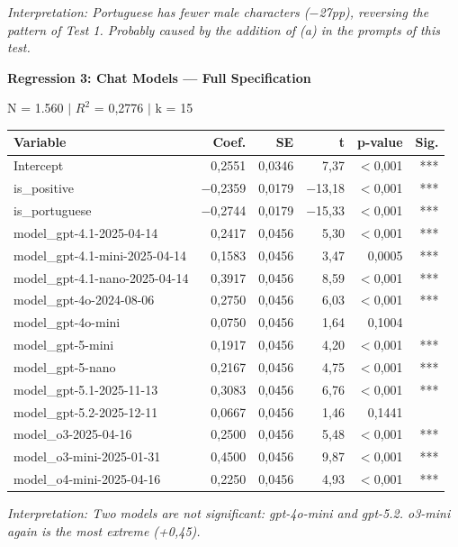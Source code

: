 \documentclass[12pt,a4paper]{article}
\begin{document}
\noindent\textit{Interpretation: Portuguese has fewer male characters ($-$27pp),
reversing the pattern of Test 1. Probably caused by the addition of (a)
in the prompts of this test.}

\vspace{0.5cm}
\noindent\textbf{Regression 3: Chat Models --- Full Specification}

\noindent N = 1.560 $|$ $R^2$ = 0,2776 $|$ k = 15

\begin{table}[H]
\centering
\small
\begin{tabular}{lrrrrr}
\toprule
\textbf{Variable} & \textbf{Coef.} & \textbf{SE} & \textbf{t} & \textbf{p-value} & \textbf{Sig.} \\
\midrule
Intercept & 0,2551 & 0,0346 & 7,37 & $<$0,001 & *** \\
is\_positive & $-$0,2359 & 0,0179 & $-$13,18 & $<$0,001 & *** \\
is\_portuguese & $-$0,2744 & 0,0179 & $-$15,33 & $<$0,001 & *** \\
model\_gpt-4.1-2025-04-14 & 0,2417 & 0,0456 & 5,30 & $<$0,001 & *** \\
model\_gpt-4.1-mini-2025-04-14 & 0,1583 & 0,0456 & 3,47 & 0,0005 & *** \\
model\_gpt-4.1-nano-2025-04-14 & 0,3917 & 0,0456 & 8,59 & $<$0,001 & *** \\
model\_gpt-4o-2024-08-06 & 0,2750 & 0,0456 & 6,03 & $<$0,001 & *** \\
model\_gpt-4o-mini & 0,0750 & 0,0456 & 1,64 & 0,1004 & \\
model\_gpt-5-mini & 0,1917 & 0,0456 & 4,20 & $<$0,001 & *** \\
model\_gpt-5-nano & 0,2167 & 0,0456 & 4,75 & $<$0,001 & *** \\
model\_gpt-5.1-2025-11-13 & 0,3083 & 0,0456 & 6,76 & $<$0,001 & *** \\
model\_gpt-5.2-2025-12-11 & 0,0667 & 0,0456 & 1,46 & 0,1441 & \\
model\_o3-2025-04-16 & 0,2500 & 0,0456 & 5,48 & $<$0,001 & *** \\
model\_o3-mini-2025-01-31 & 0,4500 & 0,0456 & 9,87 & $<$0,001 & *** \\
model\_o4-mini-2025-04-16 & 0,2250 & 0,0456 & 4,93 & $<$0,001 & *** \\
\bottomrule
\end{tabular}
\end{table}

\noindent\textit{Interpretation: Two models are not significant: gpt-4o-mini and
gpt-5.2. o3-mini again is the most extreme (+0,45).}
\end{document}
